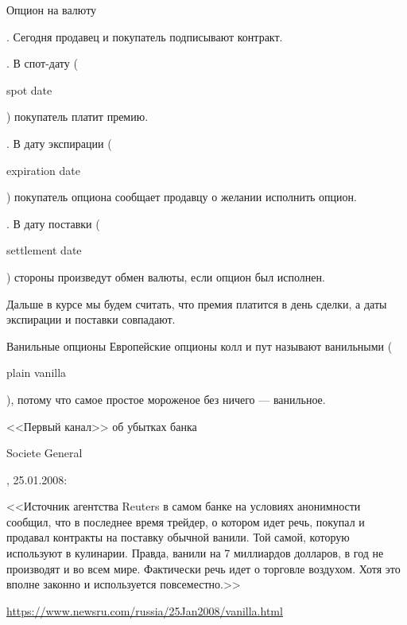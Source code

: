 \documentclass{beamer}
\newcommand{\en}[1]{\begin{otherlanguage}{english}#1\end{otherlanguage}}
\newcommand{\usdrubstrike}{80}
\begin{document}
\begin{frame}{Опцион на валюту}
\justify
\centering
{}
	
. Сегодня продавец и покупатель подписывают контракт.

. В спот-дату (\en{spot date}) покупатель платит премию.

. В дату экспирации (\en{expiration date}) покупатель опциона сообщает продавцу о желании исполнить опцион.

. В дату поставки (\en{settlement date}) стороны произведут обмен валюты, если опцион был исполнен.

\justify
Дальше в курсе мы будем считать, что премия платится в день сделки, а даты экспирации и поставки совпадают.
\end{frame}



\begin{frame}{Ванильные опционы}
\justify
Европейские опционы колл и пут называют \alert{ванильными} (\en{plain vanilla}), потому что самое простое мороженое без ничего --- ванильное.

\justify
<<Первый канал>> об убытках банка \en{Societe General}, 25.01.2008:

\justify
<<Источник агентства Reuters в самом банке на условиях анонимности сообщил, что в последнее время трейдер, о котором идет речь, покупал и продавал контракты на поставку обычной ванили. \alert{Той самой, которую используют в кулинарии}. Правда, ванили на 7 миллиардов долларов, в год не производят и во всем мире. Фактически речь идет о торговле воздухом. Хотя это вполне законно и используется повсеместно.>>

\justify
\url{https://www.newsru.com/russia/25Jan2008/vanilla.html}
\end{frame}
\end{document}
